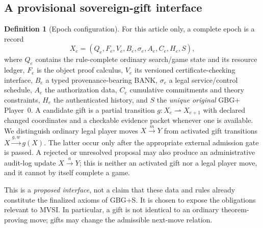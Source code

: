 \documentclass[11pt,letterpaper]{article}
\theoremstyle{definition}\newtheorem{definition}[theorem]{Definition}\newtheorem{example}[theorem]{Example}
\theoremstyle{remark}\newtheorem{remark}[theorem]{Remark}
\begin{document}
\subsection{A provisional sovereign-gift interface}
\begin{definition}[Epoch configuration]\label{mvsi:def:epoch}
For this article only, a complete epoch is a record
\[
X_e=(Q_e,F_e,V_e,B_e,\sigma_e,A_e,C_e,H_e,S),
\]
where $Q_e$ contains the rule-complete ordinary search/game state and its resource ledger, $F_e$ is the object proof calculus, $V_e$ its versioned certificate-checking interface, $B_e$ a typed provenance-bearing BANK, $\sigma_e$ a legal service/control schedule, $A_e$ the authorization data, $C_e$ cumulative commitments and theory constraints, $H_e$ the authenticated history, and $S$ the \emph{unique original} GBG+ Player~0. A candidate gift is a partial transition $g:X_e\rightharpoonup X_{e+1}$ with declared changed coordinates and a checkable evidence packet whenever one is available. We distinguish ordinary legal player moves $X\xrightarrow{m}Y$ from activated gift transitions $X\xrightarrow{g,w}g(X)$. The latter occur only after the appropriate external admission gate is passed. A rejected or unresolved proposal may also produce an administrative audit-log update $X\xrightarrow{a}Y$; this is neither an activated gift nor a legal player move, and it cannot by itself complete a game.
\end{definition}

This is a \emph{proposed interface}, not a claim that these data and rules already constitute the finalized axioms of GBG+S. It is chosen to expose the obligations relevant to MVSI. In particular, a gift is not identical to an ordinary theorem-proving move; gifts may change the admissible next-move relation.
\end{document}
